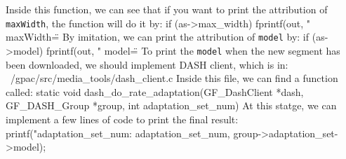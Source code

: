 \documentclass{article}%
\newenvironment{code}%
   {\snugshade\verbatim}%
   {\endverbatim\endsnugshade}
\begin{document}
\begin{Large}
Inside this function, we can see that if you want to print the attribution of \texttt{maxWidth}, the function will do it by:
\begin{code}
    	if (as->max_width) 
    	    fprintf(out, " maxWidth=\"%
\end{code}
By imitation, we can print the attribution of \texttt{model} by:
\begin{code}
    if (as->model) fprintf(out, " model=\"%
\end{code}
To print the \texttt{model} when the new segment has been downloaded, we should implement DASH client, which is in:
\begin{code}
    ~/gpac/src/media_tools/dash_client.c
\end{code}
Inside this file, we can find a function called:
\begin{code}
    static void dash_do_rate_adaptation(GF_DashClient *dash, 
        GF_DASH_Group *group, int adaptation_set_num)
\end{code}
At this statge, we can implement a few lines of code to print the final result:
\begin{code}
    printf("adaptation_set_num: %
        adaptation_set_num, group->adaptation_set->model);
\end{code}

\end{Large}
\newpage
\end{document}
